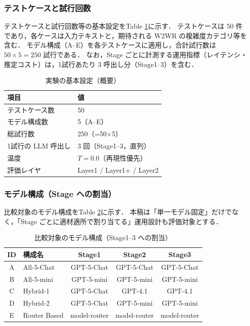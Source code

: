 \documentclass[a4paper,10pt]{jarticle}
\begin{document}
\subsubsection{テストケースと試行回数}
テストケースと試行回数等の基本設定をTable \ref{tab:exp_overview}に示す．
テストケースは 50 件であり，各ケースは入力テキストと，期待される W2WR の複雑度カテゴリ等を含む．
モデル構成（A--E）を各テストケースに適用し，合計試行数は $50 \times 5 = 250$ 試行である．
なお，Stage ごとに計測する運用指標（レイテンシ・推定コスト）は，1試行あたり 3 呼出し分（Stage1--3）を含む．

\begin{table}[!t]
\centering
\caption{実験の基本設定（概要）}
\label{tab:exp_overview}
\small
\begin{tabular}{ll} \toprule
項目 & 値 \\ \midrule
テストケース数 & 50 \\
モデル構成数 & 5（A--E）\\
総試行数 & 250（=50$\times$5）\\
1試行の LLM 呼出し & 3 回（Stage1--3，直列）\\
温度 & $T=0.0$（再現性優先）\\
評価レイヤ & Layer1 / Layer1+ / Layer2 \\ \bottomrule
\end{tabular}
\end{table}

\subsubsection{モデル構成（Stage への割当）}
比較対象のモデル構成をTable \ref{tab:model_configs}に示す．
本稿は「単一モデル固定」だけでなく，「Stage ごとに適材適所で割り当てる」運用設計も評価対象とする．

\begin{table}[!t]
\centering
\caption{比較対象のモデル構成（Stage1--3 への割当）}
\label{tab:model_configs}
\small
\begin{tabular}{clccc} \toprule
ID & 構成名 & Stage1 & Stage2 & Stage3 \\ \midrule
A & All-5-Chat & GPT-5-Chat & GPT-5-Chat & GPT-5-Chat \\
B & All-5-mini & GPT-5-mini & GPT-5-mini & GPT-5-mini \\
C & Hybrid-1 & GPT-5-Chat & GPT-4.1 & GPT-4.1 \\
D & Hybrid-2 & GPT-5-Chat & GPT-5-mini & GPT-5-mini \\
E & Router Based & model-router & model-router & model-router \\
\bottomrule
\end{tabular}
\end{table}
\end{document}
